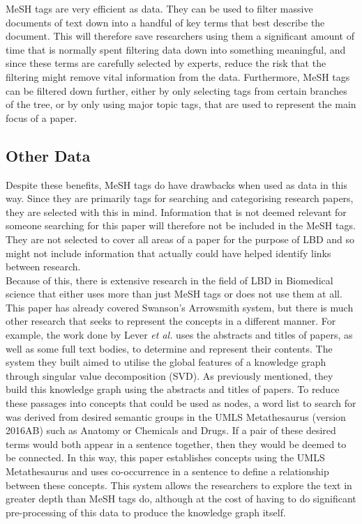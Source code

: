 \documentclass{l4proj}
\begin{document}
MeSH tags are very efficient as data. They can be used to filter massive documents of text down into a handful of key terms that best describe the document. This will therefore save researchers using them a significant amount of time that is normally spent filtering data down into something meaningful, and since these terms are carefully selected by experts, reduce the risk that the filtering might remove vital information from the data. Furthermore, MeSH tags can be filtered down further, either by only selecting tags from certain branches of the tree, or by only using major topic tags, that are used to represent the main focus of a paper. \\

\subsection{Other Data}

Despite these benefits, MeSH tags do have drawbacks when used as data in this way. Since they are primarily tags for searching and categorising research papers, they are selected with this in mind. Information that is not deemed relevant for someone searching for this paper will therefore not be included in the MeSH tags. They are not selected to cover all areas of a paper for the purpose of LBD and so might not include information that actually could have helped identify links between research. \\
 
Because of this, there is extensive research in the field of LBD in Biomedical science that either uses more than just MeSH tags or does not use them at all. This paper has already covered Swanson's Arrowsmith system, but there is much other research that seeks to represent the concepts in a different manner. For example, the work done by Lever \textit{et al.} uses the abstracts and titles of papers, as well as some full text bodies, to determine and represent their contents. The system they built aimed to utilise the global features of a knowledge graph through singular value decomposition (SVD). As previously mentioned, they build this knowledge graph using the abstracts and titles of papers. To reduce these passages into concepts that could be used as nodes, a word list to search for was derived from desired semantic groups in the UMLS Metathesaurus (version 2016AB) such as Anatomy or Chemicals and Drugs. If a pair of these desired terms would both appear in a sentence together, then they would be deemed to be connected. In this way, this paper establishes concepts using the UMLS Metathesaurus and uses co-occurrence in a sentence to define a relationship between these concepts. This system allows the researchers to explore the text in greater depth than MeSH tags do, although at the cost of having to do significant pre-processing of this data to produce the knowledge graph itself. \\ 
\end{document}
